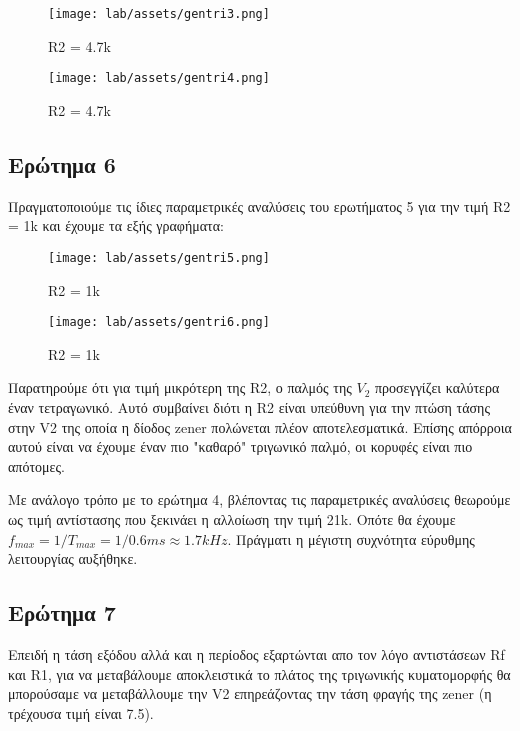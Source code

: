 \documentclass[12pt, a4paper]{article}
\begin{document}
\begin{figure}[h!]
    \centering
    \centering
	\texttt{[image: lab/assets/gentri3.png]}
    \caption{R2 = 4.7k}
\end{figure}


\begin{figure}[h!]
    \centering
	\texttt{[image: lab/assets/gentri4.png]}
    \caption{R2 = 4.7k}
\end{figure}

\pagebreak

\subsection{Ερώτημα 6}

Πραγματοποιούμε τις ίδιες παραμετρικές αναλύσεις του ερωτήματος 5 για την τιμή R2 = 1k και έχουμε τα εξής γραφήματα:


\begin{figure}[h!]
    \centering
	\texttt{[image: lab/assets/gentri5.png]}
    \caption{R2 = 1k}
\end{figure}

\begin{figure}[h!]
    \centering
	\texttt{[image: lab/assets/gentri6.png]}
    \caption{R2 = 1k}
\end{figure}

Παρατηρούμε ότι για τιμή μικρότερη της R2, ο παλμός της $V_2$ προσεγγίζει καλύτερα έναν τετραγωνικό. Αυτό συμβαίνει διότι η R2 είναι υπεύθυνη για την πτώση τάσης στην V2 της οποία η δίοδος zener πολώνεται πλέον αποτελεσματικά. Επίσης απόρροια αυτού είναι να έχουμε έναν πιο "καθαρό" τριγωνικό παλμό, οι κορυφές είναι πιο απότομες.

Με ανάλογο τρόπο με το ερώτημα 4, βλέποντας τις παραμετρικές αναλύσεις θεωρούμε ως τιμή αντίστασης που ξεκινάει η αλλοίωση την τιμή 21k. Οπότε θα έχουμε $f_{max} = 1/T_{max} = 1/0.6ms \approx 1.7kHz$. Πράγματι η μέγιστη συχνότητα εύρυθμης λειτουργίας αυξήθηκε.

\subsection{Ερώτημα 7}

Επειδή η τάση εξόδου αλλά και η περίοδος εξαρτώνται απο τον λόγο αντιστάσεων Rf και R1, για να μεταβάλουμε αποκλειστικά το πλάτος της τριγωνικής κυματομορφής θα μπορούσαμε να μεταβάλλουμε την V2 επηρεάζοντας την τάση φραγής της zener (η τρέχουσα τιμή είναι 7.5).
\end{document}
